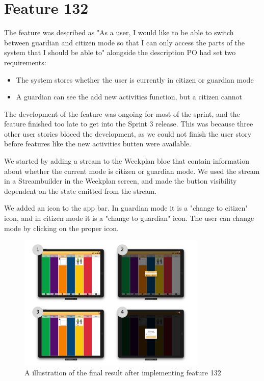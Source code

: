 \section{Feature 132}
The feature was described as "As a user, I would like to be able to switch between guardian and citizen mode so that I can only access the parts of the system that I should be able to" alongside the description \gls{PO} had set two requirements:

\begin{itemize}
  \item The system stores whether the user is currently in citizen or guardian mode
  \item A guardian can see the add new activities function, but a citizen cannot
\end{itemize}

The development of the feature was ongoing for most of the sprint, and the feature finished too late to get into the Sprint 3 release. This was because three other user stories bloced the development, as we could not finish the user story before features like the new activities butten were available. 

We started by adding a stream to the Weekplan \gls{bloc} that contain information about whether the current mode is citizen or guardian mode. We used the stream in a Streambuilder in the Weekplan screen, and made the button visibility dependent on the state emitted from the stream.

We added an icon to the app bar. In guardian mode it is a "change to citizen" icon, and in citizen mode it is a "change to guardian" icon. The user can change mode by clicking on the proper icon.

\begin{figure}[h]
    \centering
    \includegraphics[width=0.8\textwidth]{figures/feature_132.pdf}
    \caption{A illustration of the final result after implementing feature 132}
    \label{fig:feature132}
\end{figure}

